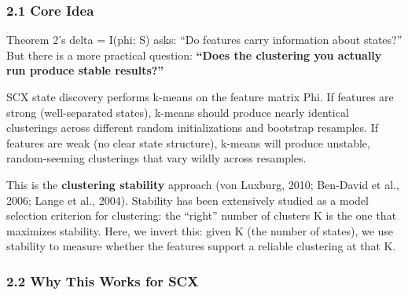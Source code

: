 \documentclass[
  12pt,
]{article}
\begin{document}
\subsubsection{2.1 Core Idea}\label{core-idea}

Theorem 2's delta = I(phi; S) asks: ``Do features carry information
about states?'' But there is a more practical question: \textbf{``Does
the clustering you actually run produce stable results?''}

SCX state discovery performs k-means on the feature matrix Phi. If
features are strong (well-separated states), k-means should produce
nearly identical clusterings across different random initializations and
bootstrap resamples. If features are weak (no clear state structure),
k-means will produce unstable, random-seeming clusterings that vary
wildly across resamples.

This is the \textbf{clustering stability} approach (von Luxburg, 2010;
Ben-David et al., 2006; Lange et al., 2004). Stability has been
extensively studied as a model selection criterion for clustering: the
``right'' number of clusters K is the one that maximizes stability.
Here, we invert this: given K (the number of states), we use stability
to measure whether the features support a reliable clustering at that K.

\subsubsection{2.2 Why This Works for SCX}\label{why-this-works-for-scx}
\end{document}
